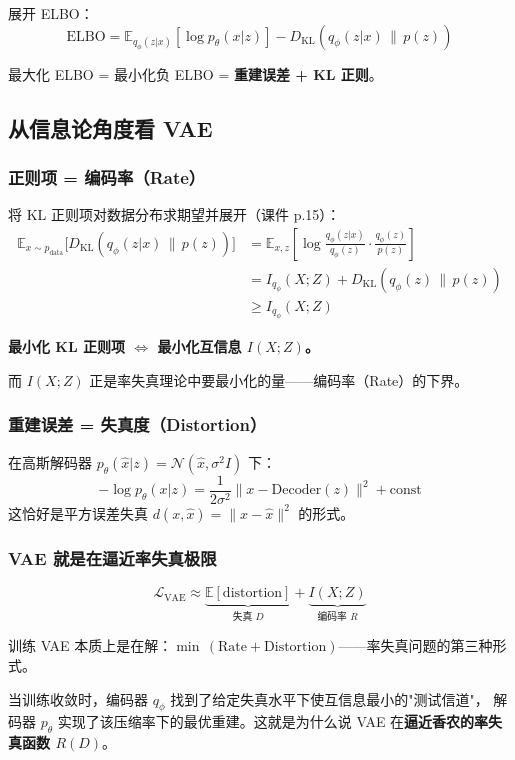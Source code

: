 \documentclass[12pt,a4paper]{ctexart}
\theoremstyle{definition}
\begin{document}
展开 ELBO：
\[
\mathrm{ELBO}
= \mathbb{E}_{q_\phi(z|x)}[\log p_\theta(x|z)] - D_{\mathrm{KL}}(q_\phi(z|x) \,\|\, p(z))
\]

最大化 ELBO = 最小化负 ELBO = \textbf{重建误差 + KL 正则}。

\subsection{从信息论角度看 VAE}

\subsubsection{正则项 = 编码率（Rate）}

将 KL 正则项对数据分布求期望并展开（课件 p.15）：
\begin{align*}
\mathbb{E}_{x\sim p_{\mathrm{data}}}\big[D_{\mathrm{KL}}(q_\phi(z|x)\,\|\,p(z))\big]
&= \mathbb{E}_{x,z}\!\left[\log\frac{q_\phi(z|x)}{q_\phi(z)} \cdot \frac{q_\phi(z)}{p(z)}\right] \\
&= I_{q_\phi}(X; Z) + D_{\mathrm{KL}}(q_\phi(z)\,\|\,p(z)) \\
&\geq I_{q_\phi}(X; Z)
\end{align*}

\textbf{最小化 KL 正则项 $\Longleftrightarrow$ 最小化互信息 $I(X;Z)$。}

而 $I(X;Z)$ 正是率失真理论中要最小化的量——编码率（Rate）的下界。

\subsubsection{重建误差 = 失真度（Distortion）}

在高斯解码器 $p_\theta(\hat{x}|z) = \mathcal{N}(\hat{x}, \sigma^2 I)$ 下：
\[
-\log p_\theta(x|z) = \frac{1}{2\sigma^2} \|x - \mathrm{Decoder}(z)\|^2 + \text{const}
\]
这恰好是平方误差失真 $d(x, \hat{x}) = \|x-\hat{x}\|^2$ 的形式。

\subsubsection{VAE 就是在逼近率失真极限}

\[
\mathcal{L}_{\mathrm{VAE}}
\approx \underbrace{\mathbb{E}[\text{distortion}]}_{\text{失真 } D}
      + \underbrace{I(X; Z)}_{\text{编码率 } R}
\]

训练 VAE 本质上是在解：$\min\,(\text{Rate} + \text{Distortion})$——率失真问题的第三种形式。

当训练收敛时，编码器 $q_\phi$ 找到了给定失真水平下使互信息最小的"测试信道"，
解码器 $p_\theta$ 实现了该压缩率下的最优重建。这就是为什么说 VAE 在\textbf{逼近香农的率失真函数 $R(D)$}。
\end{document}
